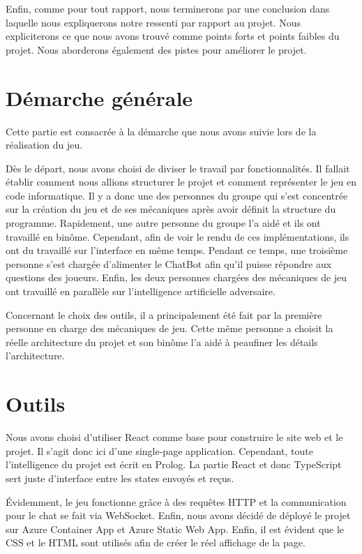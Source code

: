 \documentclass[a4paper, 11pt]{article}
\begin{document}
Enfin, comme pour tout rapport, nous terminerons par une conclusion dans laquelle nous expliquerons notre ressenti par rapport au projet. Nous expliciterons ce que nous avons trouvé comme points forts et points faibles du projet. Nous aborderons également des pistes pour améliorer le projet.

\newpage

\section{Démarche générale}

Cette partie est consacrée à la démarche que nous avons suivie lors de la réalisation du jeu.\newline

Dès le départ, nous avons choisi de diviser le travail par fonctionnalités. Il fallait établir comment nous allions structurer le projet et comment représenter le jeu en code informatique. Il y a donc une des personnes du groupe qui s'est concentrée sur la création du jeu et de ses mécaniques après avoir définit la structure du programme. Rapidement, une autre personne du groupe l'a aidé et ils ont travaillé en binôme. Cependant, afin de voir le rendu de ces implémentations, ils ont du travaillé sur l'interface en même temps. Pendant ce temps, une troisième personne s'est chargée d'alimenter le ChatBot afin qu'il puisse répondre aux questions des joueurs. Enfin, les deux personnes chargées des mécaniques de jeu ont travaillé en parallèle sur l'intelligence artificielle adversaire.\newline

Concernant le choix des outils, il a principalement été fait par la première personne en charge des mécaniques de jeu. Cette même personne a choisit la réelle architecture du projet et son binôme l'a aidé à peaufiner les détails l'architecture.

\section{Outils}

Nous avons choisi d'utiliser React comme base pour construire le site web et le projet. Il s'agit donc ici d'une single-page application. Cependant, toute l'intelligence du projet est écrit en Prolog. La partie React et donc TypeScript sert juste d'interface entre les states envoyés et reçus.\newline

Évidemment, le jeu fonctionne grâce à des requêtes HTTP et la communication pour le chat se fait via WebSocket. Enfin, nous avons décidé de déployé le projet sur Azure Container App et Azure Static Web App. Enfin, il est évident que le CSS et le HTML sont utilisés afin de créer le réel affichage de la page.
\end{document}

